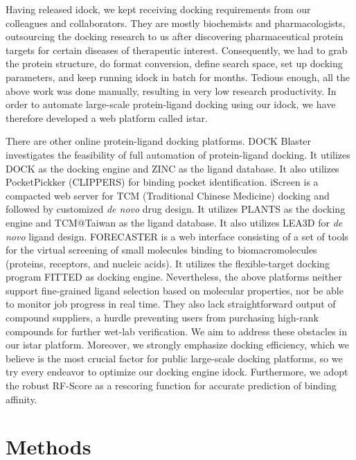 \documentclass[10pt]{article}
\begin{document}
Having released idock, we kept receiving docking requirements from our colleagues and collaborators. They are mostly biochemists and pharmacologists, outsourcing the docking research to us after discovering pharmaceutical protein targets for certain diseases of therapeutic interest. Consequently, we had to grab the protein structure, do format conversion, define search space, set up docking parameters, and keep running idock in batch for months. Tedious enough, all the above work was done manually, resulting in very low research productivity. In order to automate large-scale protein-ligand docking using our idock, we have therefore developed a web platform called istar.

There are other online protein-ligand docking platforms. DOCK Blaster \cite{557} investigates the feasibility of full automation of protein-ligand docking. It utilizes DOCK \cite{1222} as the docking engine and ZINC \cite{532,1178} as the ligand database. It also utilizes PocketPickker (CLIPPERS) \cite{395} for binding pocket identification. iScreen \cite{899} is a compacted web server for TCM (Traditional Chinese Medicine) docking and followed by customized \textit{de novo} drug design. It utilizes PLANTS \cite{610,607,779} as the docking engine and TCM@Taiwan \cite{528} as the ligand database. It also utilizes LEA3D \cite{1223} for \textit{de novo} ligand design. FORECASTER \cite{1012} is a web interface consisting of a set of tools for the virtual screening of small molecules binding to biomacromolecules (proteins, receptors, and nucleic acids). It utilizes the flexible-target docking program FITTED \cite{602} as docking engine. Nevertheless, the above platforms neither support fine-grained ligand selection based on molecular properties, nor be able to monitor job progress in real time. They also lack straightforward output of compound suppliers, a hurdle preventing users from purchasing high-rank compounds for further wet-lab verification. We aim to address these obstacles in our istar platform. Moreover, we strongly emphasize docking efficiency, which we believe is the most crucial factor for public large-scale docking platforms, so we try every endeavor to optimize our docking engine idock. Furthermore, we adopt the robust RF-Score \cite{564} as a rescoring function for accurate prediction of binding affinity.

\section*{Methods}
\end{document}
